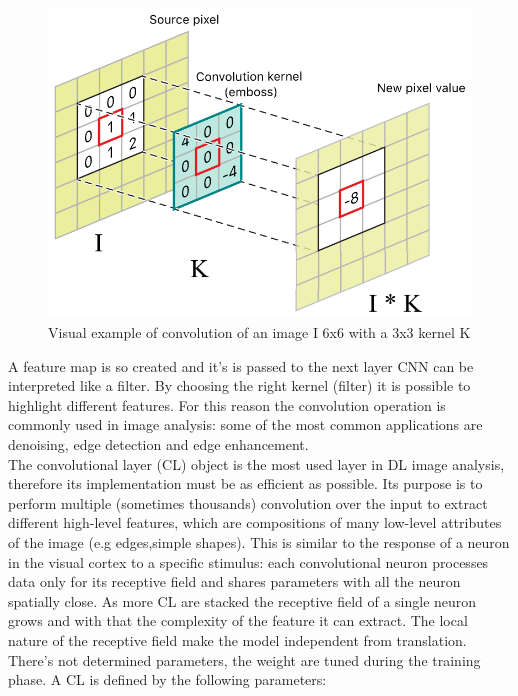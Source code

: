 \documentclass[a4paper, 10pt]{book}
\begin{document}
\begin{figure}[htp]
    \centering
    \includegraphics[width=15cm]{conv.png}
    \caption{Visual example of convolution of an image I 6x6 with a 3x3 kernel K}
    \label{fig:conv_layer}
\end{figure}
A feature map is so created and it’s is passed to the next layer
CNN can be interpreted like a filter. By choosing the right kernel (filter) it is possible to highlight different features. 
For this reason the convolution operation is commonly used in image analysis: some of the most common applications are denoising, edge detection and edge enhancement.
\\
The convolutional layer (CL) object is the most used layer in DL image analysis, therefore its implementation must be as efficient as possible. Its purpose is to perform multiple (sometimes thousands) convolution over the input to extract different high-level features, which are compositions of many low-level attributes of the image (e.g edges,simple shapes). 
This is similar to the response of a neuron in the visual cortex to a specific stimulus: each convolutional neuron processes data only for its receptive field and shares parameters with all the neuron spatially close.
As more CL are stacked the receptive field of a single neuron grows and with that the complexity of the feature it can extract.
The local nature of the receptive field make the model independent from translation.
There’s not determined parameters, the weight are tuned during the training phase. A CL is defined by the following parameters: 
\end{document}
